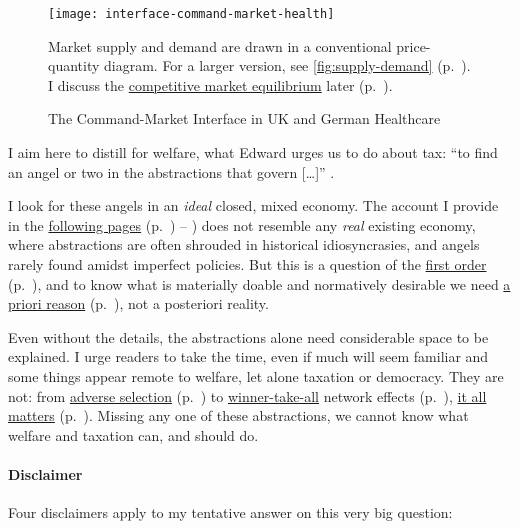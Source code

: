 \begin{landscape}
 \begin{figure}[htbp]
	\begin{center}
	\texttt{[image: interface-command-market-health]}
	\caption[Command-Market Interface in UK and German Healthcare]{The Command-Market Interface in UK and German Healthcare}
	\label{fig:interface-command-market-health}
	\end{center}
\scriptsize{
	Market supply and demand are drawn in a conventional price-quantity diagram.
	For a larger version, see \autoref{fig:supply-demand} (p.~\pageref{fig:supply-demand}).
	I discuss the \hyperref[sec:market-solutions-production]{competitive market equilibrium} later (p.~\pageref{sec:market-solutions-production}).}
\end{figure}
\end{landscape}

I aim here to distill for welfare, what Edward \citeauthor{McCaffery2002} urges us to do about tax:
``to find an angel or two in the abstractions that govern [\ldots]'' \citeyearpar[K117]{McCaffery2002}.

I look for these angels in an \emph{ideal} closed, mixed economy.
The account I provide in the \hyperref[chap:mixed-economy]{following pages} (p.~\pageref{chap:mixed-economy}) -- \pageref{sec:EU-reality}) does not resemble any \emph{real} existing economy, where abstractions are often shrouded in historical idiosyncrasies, and angels rarely found amidst imperfect policies.
But this is a question of the \hyperref[sec:1st-questions-first]{first order} (p.~\pageref{sec:1st-questions-first}), and to know what is materially doable and normatively desirable we need \hyperref[itm:a-priori]{a priori reason} (p.~\pageref{itm:a-priori}), not a posteriori reality.

Even without the details, the abstractions alone need considerable space to be explained.
I urge readers to take the time, even if much will seem familiar and some things appear remote to welfare, let alone taxation or democracy.
They are not:
from \hyperref[sec:adverse-selection]{adverse selection} (p.~\pageref{sec:adverse-selection}) to \hyperref[sec:winner-take-all]{winner-take-all} network effects (p.~\pageref{sec:winner-take-all}), \hyperref[sec:why-mixed-economy-matters]{it all matters} (p.~\pageref{sec:why-mixed-economy-matters}).
Missing any one of these abstractions, we cannot know what welfare and taxation can, and should do.

\paragraph{Disclaimer}
Four disclaimers apply to my tentative answer on this very big question: \label{sec:disclaimers}

